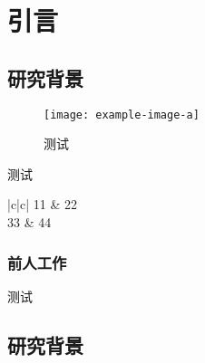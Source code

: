 \chapter{引言}

\section{研究背景}
\begin{figure}[tbh]
  \centering
  \texttt{[image: example-image-a]}
  \caption{测试}
\end{figure}
\begin{table}[tbh]
  \caption{测试}
  \centering
  \begin{tblr}{|c|c|}
    11 & 22 \\
    33 & 44 
  \end{tblr}
\end{table}



\subsection{前人工作}


测试 \parencite{邱泽奇建构与分化}
\section{研究背景}
